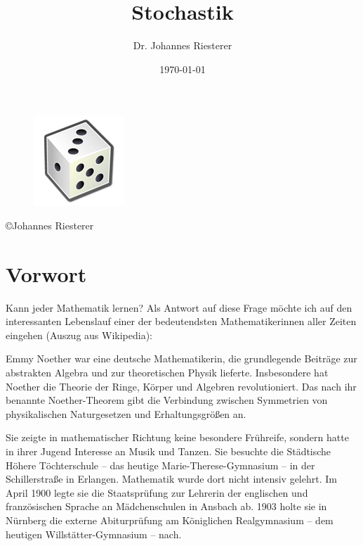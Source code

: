 \title{ Stochastik}
\author{Dr. Johannes Riesterer}
\date{\today}
\maketitle\thispagestyle{empty}
 \begin{figure}[H]
    \centering
    \includegraphics[width=1.0 \textwidth]{images/cover.png}
    \label{fig:diffus}
\end{figure}
\newpage 
\begin{center}
\large
 \copyright Johannes Riesterer \\
\end{center}
\thispagestyle{empty}
\newpage

\section*{Vorwort}
Kann jeder Mathematik lernen? Als Antwort auf diese Frage möchte ich auf den interessanten Lebenslauf
einer der bedeutendsten Mathematikerinnen aller Zeiten eingehen  (Auszug aus Wikipedia):

Emmy Noether war eine deutsche Mathematikerin, die grundlegende Beiträge zur abstrakten Algebra und zur theoretischen Physik lieferte. Insbesondere hat Noether die Theorie der Ringe, Körper und Algebren revolutioniert. Das nach ihr benannte Noether-Theorem gibt die Verbindung zwischen Symmetrien von physikalischen Naturgesetzen und Erhaltungsgrößen an. 

Sie zeigte in mathematischer Richtung keine besondere Frühreife, sondern hatte in ihrer Jugend Interesse an Musik und Tanzen. Sie besuchte die Städtische Höhere Töchterschule – das heutige Marie-Therese-Gymnasium – in der Schillerstraße in Erlangen. Mathematik wurde dort nicht intensiv gelehrt. Im April 1900 legte sie die Staatsprüfung zur Lehrerin der englischen und französischen Sprache an Mädchenschulen in Ansbach ab. 1903 holte sie in Nürnberg die externe Abiturprüfung am Königlichen Realgymnasium – dem heutigen Willstätter-Gymnasium – nach. 


\newpage

